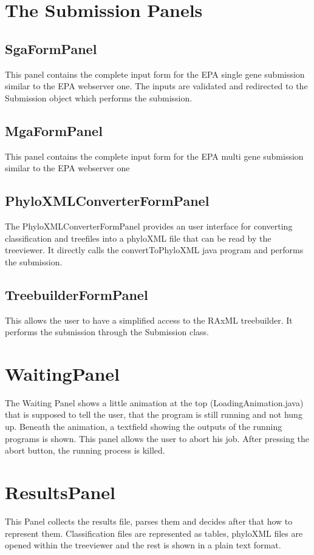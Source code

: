 \documentclass{scrartcl}
\begin{document}
	\section{The Submission Panels}
		\subsection{SgaFormPanel}
			This panel contains the complete input form for the EPA single gene submission similar to the EPA  webserver one. The inputs are validated and redirected to the Submission object which performs the submission. 
		\subsection{MgaFormPanel}
			This panel contains the complete input form for the EPA multi gene submission similar to the EPA webserver one
		\subsection{PhyloXMLConverterFormPanel}
			The PhyloXMLConverterFormPanel provides an user interface for converting classification and treefiles into a phyloXML file that can be read by the treeviewer. It directly calls the convertToPhyloXML java program and performs the submission. 
		\subsection{TreebuilderFormPanel}
			This allows the user to have a simplified access to the RAxML treebuilder.  It performs the submission through the Submission class. 
	\section{WaitingPanel}
		The Waiting Panel shows a little animation at the top (LoadingAnimation.java) that is supposed to tell the user, that the program is still running and not hung up. Beneath the animation, a textfield showing the outputs of the running programs is shown. This panel allows the user to abort his job. After pressing the abort button, the running process is killed. 
	\section{ResultsPanel}
	This Panel collects the results file, parses them and decides after that how to represent them. Classification files are represented as tables, phyloXML files are opened within the treeviewer and the rest is shown in a plain text format.
	
\end{document}
